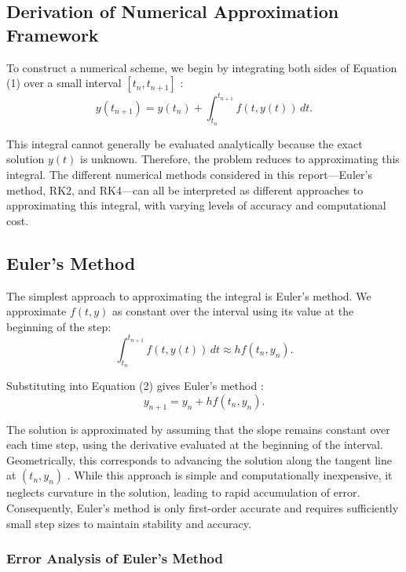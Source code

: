\documentclass{article}
\begin{document}
\subsection{Derivation of Numerical Approximation Framework}

To construct a numerical scheme, we begin by integrating both sides of Equation (1) over a small interval $[t_n, t_{n+1}]$ \cite{2}:
\begin{equation}
y(t_{n+1}) = y(t_n) + \int_{t_n}^{t_{n+1}} f(t,y(t)) \,dt.
\end{equation}

This integral cannot generally be evaluated analytically because the exact solution $y(t)$ is unknown. Therefore, the problem reduces to approximating this integral. The different numerical methods considered in this report---Euler’s method, RK2, and RK4---can all be interpreted as different approaches to approximating this integral, with varying levels of accuracy and computational cost.

\subsection{Euler's Method}

The simplest approach to approximating the integral is Euler’s method. We approximate $f(t,y)$ as constant over the interval using its value at the beginning of the step:
\begin{equation}
\int_{t_n}^{t_{n+1}} f(t,y(t)) \, dt \approx h f(t_n, y_n).
\end{equation}

Substituting into Equation (2) gives Euler’s method \cite{3}:
\begin{equation}
y_{n+1} = y_n + h f(t_n, y_n).
\end{equation}

The solution is approximated by assuming that the slope remains constant over each time step, using the derivative evaluated at the beginning of the interval. Geometrically, this corresponds to advancing the solution along the tangent line at $(t_n, y_n)$ \cite{3}. While this approach is simple and computationally inexpensive, it neglects curvature in the solution, leading to rapid accumulation of error. Consequently, Euler’s method is only first-order accurate and requires sufficiently small step sizes to maintain stability and accuracy.

\subsubsection{Error Analysis of Euler's Method}
\end{document}
